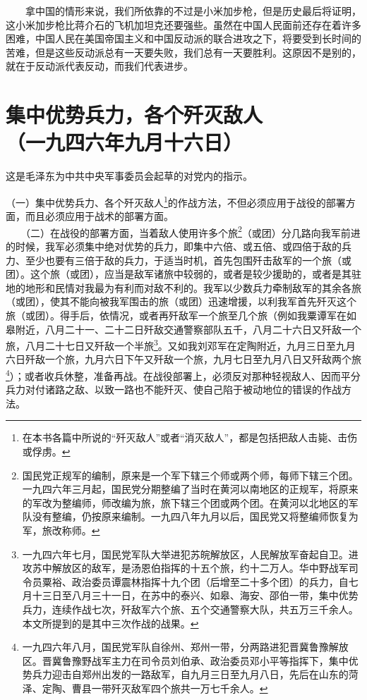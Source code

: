\documentclass[cn,11pt,chinese]{elegantbook}
\def\myformat#1{\hfil\hfil #1}
\begin{document}
　　拿中国的情形来说，我们所依靠的不过是小米加步枪，但是历史最后将证明，这小米加步枪比蒋介石的飞机加坦克还要强些。虽然在中国人民面前还存在着许多困难，中国人民在美国帝国主义和中国反动派的联合进攻之下，将要受到长时间的苦难，但是这些反动派总有一天要失败，我们总有一天要胜利。这原因不是别的，就在于反动派代表反动，而我们代表进步。\\
\newpage\section*{\myformat{集中优势兵力，各个歼灭敌人}\\\myformat{（一九四六年九月十六日）}}
\begin{introduction}\item  这是毛泽东为中共中央军事委员会起草的对党内的指示。\end{introduction}
（一）集中优势兵力、各个歼灭敌人\footnote[1]{ 在本书各篇中所说的“歼灭敌人”或者“消灭敌人”，都是包括把敌人击毙、击伤或俘虏。}的作战方法，不但必须应用于战役的部署方面，而且必须应用于战术的部署方面。\\
　　（二）在战役的部署方面，当着敌人使用许多个旅\footnote[2]{ 国民党正规军的编制，原来是一个军下辖三个师或两个师，每师下辖三个团。一九四六年三月起，国民党分期整编了当时在黄河以南地区的正规军，将原来的军改为整编师，师改编为旅，旅下辖三个团或两个团。在黄河以北地区的军队没有整编，仍按原来编制。一九四八年九月以后，国民党又将整编师恢复为军，旅改称师。}（或团）分几路向我军前进的时候，我军必须集中绝对优势的兵力，即集中六倍、或五倍、或四倍于敌的兵力、至少也要有三倍于敌的兵力，于适当时机，首先包围歼击敌军的一个旅（或团）。这个旅（或团），应当是敌军诸旅中较弱的，或者是较少援助的，或者是其驻地的地形和民情对我最为有利而对敌不利的。我军以少数兵力牵制敌军的其余各旅（或团），使其不能向被我军围击的旅（或团）迅速增援，以利我军首先歼灭这个旅（或团）。得手后，依情况，或者再歼敌军一个旅至几个旅（例如我粟谭军在如皋附近，八月二十一、二十二日歼敌交通警察部队五千，八月二十六日又歼敌一个旅，八月二十七日又歼敌一个半旅\footnote[3]{ 一九四六年七月，国民党军队大举进犯苏皖解放区，人民解放军奋起自卫。进攻苏中解放区的敌军，是汤恩伯指挥的十五个旅，约十二万人。华中野战军司令员粟裕、政治委员谭震林指挥十九个团（后增至二十多个团）的兵力，自七月十三日至八月三十一日，在苏中的泰兴、如皋、海安、邵伯一带，集中优势兵力，连续作战七次，歼敌军六个旅、五个交通警察大队，共五万三千余人。本文所提到的是其中三次作战的战果。}。又如我刘邓军在定陶附近，九月三日至九月六日歼敌一个旅，九月六日下午又歼敌一个旅，九月七日至九月八日又歼敌两个旅\footnote[4]{ 一九四六年八月，国民党军队自徐州、郑州一带，分两路进犯晋冀鲁豫解放区。晋冀鲁豫野战军主力在司令员刘伯承、政治委员邓小平等指挥下，集中优势兵力迎击自郑州出发的一路敌军，自九月三日至九月八日，先后在山东的菏泽、定陶、曹县一带歼灭敌军四个旅共一万七千余人。}）；或者收兵休整，准备再战。在战役部署上，必须反对那种轻视敌人、因而平分兵力对付诸路之敌、以致一路也不能歼灭、使自己陷于被动地位的错误的作战方法。\\
\end{document}

